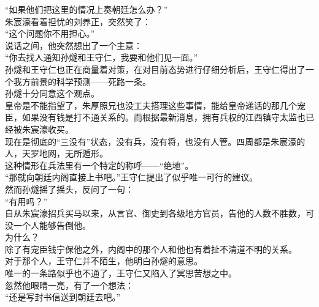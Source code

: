 \begin{multicols}{\theparacolNo}
“如果他们把这里的情况上奏朝廷怎么办？”\\

朱宸濠看着担忧的刘养正，突然笑了：\\

“这个问题你不用担心。”\\

说话之间，他突然想出了一个主意：\\

“你去找人通知孙燧和王守仁，我要和他们见一面。”\\

孙燧和王守仁也正在商量着对策，在对目前态势进行仔细分析后，王守仁得出了一个我方前景的科学预测——死路一条。\\

孙燧十分同意这个观点。\\

皇帝是不能指望了，朱厚照兄也没工夫搭理这些事情，能给皇帝递话的那几个宠臣，如果没有钱是打不通关系的。而根据最新消息，拥有兵权的江西镇守太监也已经被朱宸濠收买。\\

现在是彻底的“三没有”状态，没有兵，没有将，也没有人管。四周都是朱宸濠的人，天罗地网，无所遁形。\\

这种情形在兵法里有一个特定的称呼——“绝地”。\\

“那就向朝廷内阁直接上书吧。”王守仁提出了似乎唯一可行的建议。\\

然而孙燧摇了摇头，反问了一句：\\

“有用吗？”\\

自从朱宸濠招兵买马以来，从言官、御史到各级地方官员，告他的人数不胜数，可没一个人能够告倒他。\\

为什么？\\

除了有宠臣钱宁保他之外，内阁中的那个人和他也有着扯不清道不明的关系。\\

对于那个人，王守仁并不陌生，他明白孙燧的意思。\\

唯一的一条路似乎也不通了，王守仁又陷入了冥思苦想之中。\\

忽然他眼睛一亮，有了一个想法：\\

“还是写封书信送到朝廷去吧。”\\


\end{multicols}
